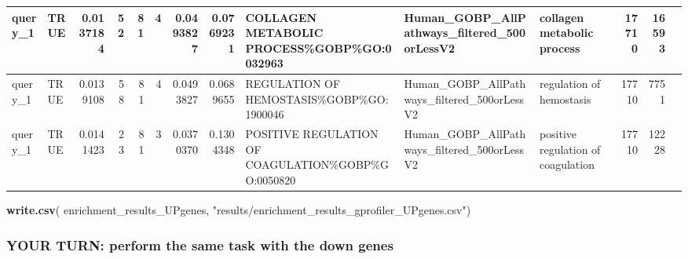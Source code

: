 \documentclass[
]{book}
\newenvironment{Shaded}{\begin{snugshade}}{\end{snugshade}}
\newcommand{\FunctionTok}[1]{\textcolor[rgb]{0.13,0.29,0.53}{\textbf{#1}}}
\newcommand{\NormalTok}[1]{#1}
\newcommand{\StringTok}[1]{\textcolor[rgb]{0.31,0.60,0.02}{#1}}
\begin{document}
\begin{table}
\begin{tabular}[t]{l|l|r|r|r|r|r|r|l|l|l|r|r|l}
\hline
query\_1 & TRUE & 0.0137184 & 52 & 81 & 4 & 0.0493827 & 0.0769231 & COLLAGEN METABOLIC PROCESS\%GOBP\%GO:0032963 & Human\_GOBP\_AllPathways\_filtered\_500orLessV2 & collagen metabolic process & 17710 & 16593 & \\
\hline
query\_1 & TRUE & 0.0139108 & 58 & 81 & 4 & 0.0493827 & 0.0689655 & REGULATION OF HEMOSTASIS\%GOBP\%GO:1900046 & Human\_GOBP\_AllPathways\_filtered\_500orLessV2 & regulation of hemostasis & 17710 & 7751 & \\
\hline
query\_1 & TRUE & 0.0141423 & 23 & 81 & 3 & 0.0370370 & 0.1304348 & POSITIVE REGULATION OF COAGULATION\%GOBP\%GO:0050820 & Human\_GOBP\_AllPathways\_filtered\_500orLessV2 & positive regulation of coagulation & 17710 & 12228 & \\
\hline
\end{tabular}
\end{table}

\begin{Shaded}
\begin{Highlighting}[]
\FunctionTok{write.csv}\NormalTok{( enrichment\_results\_UPgenes, }\StringTok{"results/enrichment\_results\_gprofiler\_UPgenes.csv"}\NormalTok{)}
\end{Highlighting}
\end{Shaded}

\subsubsection{YOUR TURN: perform the same task with the down genes}\label{your-turn-perform-the-same-task-with-the-down-genes}
\end{document}
